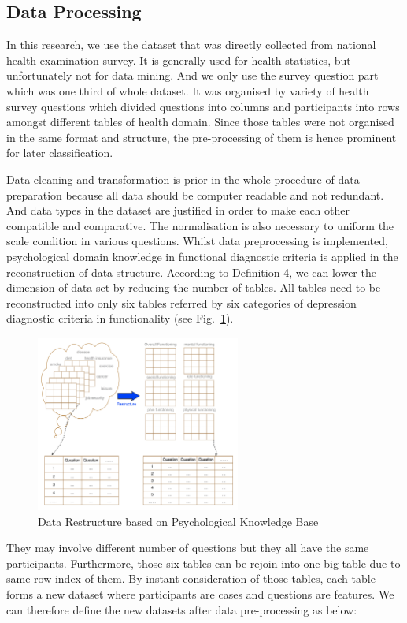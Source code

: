 \documentclass[10pt,journal,compsoc]{IEEEtran}
\begin{document}
\subsection{Data Processing}
In this research, we use the dataset that was directly collected from national health examination survey. It is generally used for health statistics, but unfortunately not for data mining. And we only use the survey question part which was one third of whole dataset. It was organised by variety of health survey questions which divided questions into columns and participants into rows amongst different tables of health domain. Since those tables were not organised in the same format and structure, the pre-processing of them is hence prominent for later classification. 

Data cleaning and transformation is prior in the whole procedure of data preparation because all data should be computer readable and not redundant. And data types in the dataset are justified in order to make each other compatible and comparative. The normalisation is also necessary to uniform the scale condition in various questions. Whilst data preprocessing is implemented, psychological domain knowledge in functional diagnostic criteria is applied in the reconstruction of data structure. According to Definition 4, we can lower the dimension of data set by reducing the number of tables. All tables need to be reconstructed into only six tables referred by six categories of depression diagnostic criteria in functionality (see Fig.~\ref{fig3}).
\begin{figure}[h]
\hspace{2cm}
\includegraphics[width=0.6\textwidth]{restructure.png}
\caption{Data Restructure based on Psychological Knowledge Base} \label{fig3}
\end{figure}
They may involve different number of questions but they all have the same participants. Furthermore, those six tables can be rejoin into one big table due to same row index of them. By instant consideration of those tables, each table forms a new dataset where participants are cases and questions are features. We can therefore define the new datasets after data pre-processing as below:\\
\end{document}

